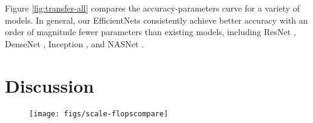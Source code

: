 \documentclass{article}
\begin{document}
Figure \ref{fig:transfer-all} compares the accuracy-parameters curve for a variety of models. In general, our EfficientNets  consistently achieve better accuracy with an order of magnitude fewer parameters than existing models, including ResNet \cite{resnet16}, DenseNet \cite{densenet17}, Inception \cite{inceptionv417}, and NASNet \cite{nas_imagenet18}.



\section{Discussion}
\label{sec:discuss}
\begin{figure}[!t]
	\centering
	\texttt{[image: figs/scale-flopscompare]}
	\vskip -0.2in
	\caption{
	}
	\label{fig:scale-flopscompare}
	\vskip -0.1in
\end{figure}
\begin{table}                                                               
  \caption{                                                                         
      \textbf{Scaled Models Used in Figure \ref{fig:cam}.}
  }                                                                                 
  \vskip 0.1in
  \centering   

  \label{tab:cam-model}
  \vskip -0.1in
\end{table} 
 
\end{document}

